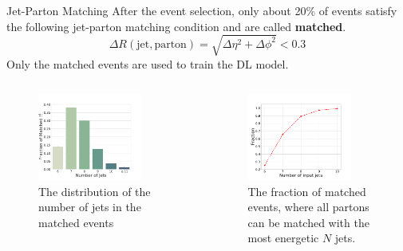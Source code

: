 \begin{frame}[fragile]{Jet-Parton Matching}
  After the event selection, only about 20\% of \ttbar events satisfy the
  following jet-parton matching condition and are called \textbf{matched}.
  $$\Delta R(\text{jet}, \text{parton}) = \sqrt{\Delta\eta^{2}+\Delta\phi^{2}} < 0.3$$
  Only the matched \ttbar events are used to train the DL model.
  \begin{columns}[T,onlytextwidth]
    \begin{figure}
      \centering
      \includegraphics[width=0.8\textwidth]{fig/jet-parton-matching/num-jets.pdf}
      \caption{The distribution of the number of jets in the matched \ttbar events}
    \end{figure}
    \begin{figure}
      \centering
      \includegraphics[width=0.8\textwidth]{fig/jet-parton-matching/frac-vs-num-jets.pdf}
      \caption{The fraction of matched \ttbar events, where all partons can be matched with the most energetic $N$ jets.}
    \end{figure}
  \end{columns}
\end{frame}


